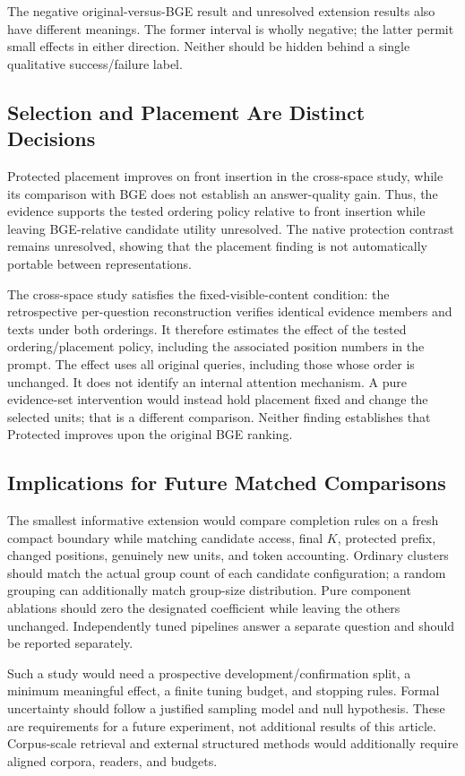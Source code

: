 \documentclass[11pt,a4paper]{article}
\begin{document}
The negative original-versus-BGE result and unresolved extension results
also have different meanings. The former interval is wholly negative; the
latter permit small effects in either direction. Neither should be hidden
behind a single qualitative success/failure label.

\subsection{Selection and Placement Are Distinct Decisions}
Protected placement improves on front insertion in the cross-space study,
while its comparison with BGE does not establish an answer-quality gain.
Thus, the evidence supports the tested ordering policy relative to front
insertion while leaving BGE-relative candidate utility unresolved.
The native protection contrast remains unresolved, showing that the placement
finding is not automatically portable between representations.

The cross-space study satisfies the fixed-visible-content condition:
the retrospective per-question reconstruction verifies identical evidence
members and texts under both orderings. It therefore estimates the effect of
the tested ordering/placement policy, including the associated position
numbers in the prompt. The effect uses all original queries, including those
whose order is unchanged. It does not identify an internal attention mechanism.
A pure evidence-set intervention would instead hold placement fixed and
change the selected units; that is a different comparison. Neither finding
establishes that Protected improves upon the original BGE ranking.

\subsection{Implications for Future Matched Comparisons}
The smallest informative extension would compare completion rules on a fresh
compact boundary while matching candidate access, final $K$, protected
prefix, changed positions, genuinely new units, and token accounting.
Ordinary clusters should match the actual group count of each candidate
configuration; a random grouping can additionally match group-size
distribution. Pure component ablations should zero the designated
coefficient while leaving the others unchanged. Independently tuned
pipelines answer a separate question and should be reported separately.

Such a study would need a prospective development/confirmation split, a
minimum meaningful effect, a finite tuning budget, and stopping rules.
Formal uncertainty should follow a justified sampling model and null
hypothesis. These are requirements for a future experiment, not additional
results of this article. Corpus-scale retrieval and external structured
methods would additionally require aligned corpora, readers, and budgets.
\end{document}
